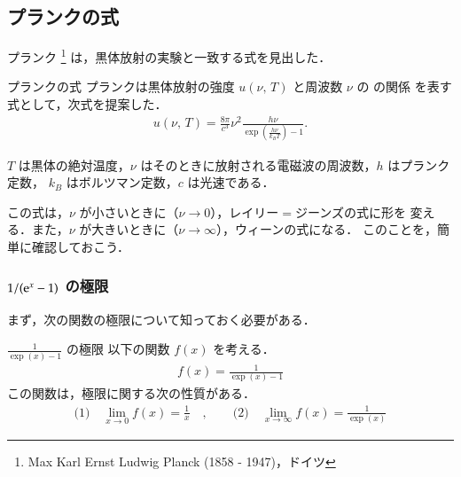         \subsection{プランクの式}
            プランク
                \footnote{
                    Max Karl Ernst Ludwig Planck (1858 - 1947)，ドイツ
                }
            は，黒体放射の実験と一致する式を見出した．
            \begin{myshadebox}{プランクの式}
                プランクは黒体放射の強度 $u(\nu,\,T)$ と周波数 $\nu$ の の関係
                を表す式として，次式を提案した．
                    \begin{align}
                        u(\nu,\,T) = \frac{8 \pi}{{c}^{3}}
                                     {\nu}^{2}
                                     \frac{h \nu}{\exp\left( \frac{h \nu}{{k}_{B}T} \right) - 1}.
                    \end{align}

                $T$ は黒体の絶対温度，$\nu$ はそのときに放射される電磁波の周波数，$h$ はプランク定数，
                ${k}_{B}$ はボルツマン定数，$c$ は光速である．
            \end{myshadebox}

            この式は，$\nu$ が小さいときに（$\nu \rightarrow 0$），レイリー$=$ジーンズの式に形を
            変える．また，$\nu$ が大きいときに（$\nu \rightarrow \infty$），ウィーンの式になる．
            このことを，簡単に確認しておこう．

            \subsubsection{$1/({\mathrm{e}}^{x} -1)$ の極限}
            まず，次の関数の極限について知っておく必要がある．
            \begin{myshadebox}{$\displaystyle \frac{1}{\exp(x) - 1}$ の極限}
                以下の関数 $f(x)$ を考える．
                \begin{align}
                    f(x) = \frac{1}{\exp(x) - 1}
                \end{align}
                この関数は，極限に関する次の性質がある．
                \begin{align*}
                    \mbox{(1)} \quad \lim_{x \rightarrow 0} f(x) = \frac{1}{x} \quad , \qquad
                    \mbox{(2)} \quad \lim_{x \rightarrow \infty} f(x) = \frac{1}{\exp(x)}
                \end{align*}
            \end{myshadebox}

